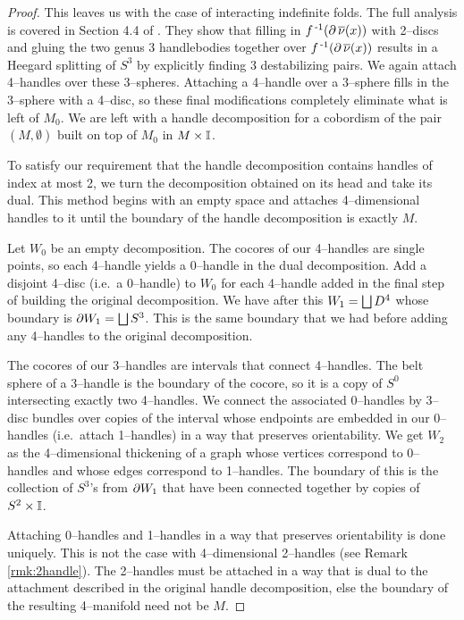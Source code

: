 \begin{proof}
	This leaves us with the case of interacting indefinite folds.
	The full analysis is covered in Section 4.4 of \cite{CostThur08}.
	They show that filling in $f^{\,\text{-}1}(\partial\,\overline{\nu}(x))$ with 2--discs and gluing the two genus 3 handlebodies together over $f^{\,\text{-}1}(\partial\,\overline{\nu}(x))$ results in a Heegard splitting of $S^3$ by explicitly finding 3 destabilizing pairs.
	We again attach 4--handles over these 3--spheres.
	Attaching a 4--handle over a 3--sphere fills in the 3--sphere with a 4--disc, so these final modifications completely eliminate what is left of $M_0$.
	We are left with a handle decomposition for a cobordism of the pair $(M,\emptyset)$ built on top of $M_0$ in $M\times\mathbb{I}$.

	To satisfy our requirement that the handle decomposition contains handles of index at most 2, we turn the decomposition obtained on its head and take its dual.
	This method begins with an empty space and attaches 4--dimensional handles to it until the boundary of the handle decomposition is exactly $M$.
	
	Let $W_0$ be an empty decomposition.
	The cocores of our 4--handles are single points, so each 4--handle yields a 0--handle in the dual decomposition.
	Add a disjoint 4--disc (i.e.\ a 0--handle) to $W_0$ for each 4--handle added in the final step of building the original decomposition.
	We have after this $W_1=\bigsqcup D^4$ whose boundary is $\partial W_1 = \bigsqcup S^3$.
	This is the same boundary that we had before adding any 4--handles to the original decomposition.
	
	The cocores of our 3--handles are intervals that connect 4--handles.
	The belt sphere of a 3--handle is the boundary of the cocore, so it is a copy of $S^0$ intersecting exactly two 4--handles.
	We connect the associated 0--handles by 3--disc bundles over copies of the interval whose endpoints are embedded in our 0--handles (i.e.\ attach 1--handles) in a way that preserves orientability.
	We get $W_2$ as the 4--dimensional thickening of a graph whose vertices correspond to 0--handles and whose edges correspond to 1--handles.
	The boundary of this is the collection of $S^3$'s from $\partial W_1$ that have been connected together by copies of $S^2\times\mathbb{I}$.

	Attaching 0--handles and 1--handles in a way that preserves orientability is done uniquely.
	This is not the case with 4--dimensional 2--handles (see Remark \ref{rmk:2handle}).
	The 2--handles must be attached in a way that is dual to the attachment described in the original handle decomposition, else the boundary of the resulting 4--manifold need not be $M$.
	

\end{proof}
